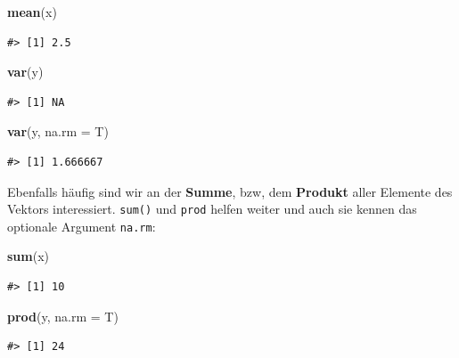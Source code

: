 \documentclass[]{tufte-book}
\newenvironment{Shaded}{}{}
\newcommand{\KeywordTok}[1]{\textcolor[rgb]{0.00,0.44,0.13}{\textbf{#1}}}
\newcommand{\DataTypeTok}[1]{\textcolor[rgb]{0.56,0.13,0.00}{#1}}
\newcommand{\NormalTok}[1]{#1}
\begin{document}
\begin{Shaded}
\begin{Highlighting}[]
\KeywordTok{mean}\NormalTok{(x)}
\end{Highlighting}
\end{Shaded}

\begin{verbatim}
#> [1] 2.5
\end{verbatim}

\begin{Shaded}
\begin{Highlighting}[]
\KeywordTok{var}\NormalTok{(y)}
\end{Highlighting}
\end{Shaded}

\begin{verbatim}
#> [1] NA
\end{verbatim}

\begin{Shaded}
\begin{Highlighting}[]
\KeywordTok{var}\NormalTok{(y, }\DataTypeTok{na.rm =}\NormalTok{ T)}
\end{Highlighting}
\end{Shaded}

\begin{verbatim}
#> [1] 1.666667
\end{verbatim}

Ebenfalls häufig sind wir an der \textbf{Summe}, bzw, dem
\textbf{Produkt} aller Elemente des Vektors interessiert. \texttt{sum()}
und \texttt{prod} helfen weiter und auch sie kennen das optionale
Argument \texttt{na.rm}:

\begin{Shaded}
\begin{Highlighting}[]
\KeywordTok{sum}\NormalTok{(x)}
\end{Highlighting}
\end{Shaded}

\begin{verbatim}
#> [1] 10
\end{verbatim}

\begin{Shaded}
\begin{Highlighting}[]
\KeywordTok{prod}\NormalTok{(y, }\DataTypeTok{na.rm =}\NormalTok{ T)}
\end{Highlighting}
\end{Shaded}

\begin{verbatim}
#> [1] 24
\end{verbatim}
\end{document}
